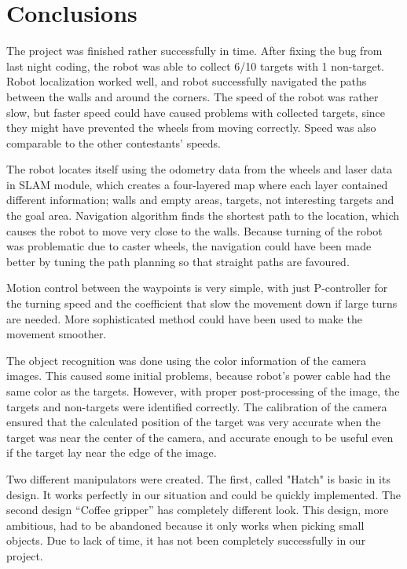 \documentclass[a4paper,10pt]{article}
\begin{document}
\section{Conclusions}

The project was finished rather successfully in time. After fixing the bug from last night coding, the robot was able to collect 6/10 targets with 1 non-target. Robot localization worked well, and robot successfully navigated the paths between the walls and around the corners. The speed of the robot was rather slow, but faster speed could have caused problems with collected targets, since they might have prevented the wheels from moving correctly. Speed was also comparable to the other contestants' speeds.

The robot locates itself using the odometry data from the wheels and laser data in SLAM module, which creates a four-layered map where each layer contained different information; walls and empty areas, targets, not interesting targets and the goal area. Navigation algorithm finds the shortest path to the location, which causes the robot to move very close to the walls. Because turning of the robot was problematic due to caster wheels, the navigation could have been made better by tuning the path planning so that straight paths are favoured.

Motion control between the waypoints is very simple, with just P-controller for the turning speed and the coefficient that slow the movement down if large turns are needed. More sophisticated method could have been used to make the movement smoother.

The object recognition was done using the color information of the camera images. This caused some initial problems, because robot’s power cable had the same color as the targets. However, with proper post-processing of the image, the targets and non-targets were identified correctly. The calibration of the camera ensured that the calculated position of the target was very accurate when the target was near the center of the camera, and accurate enough to be useful even if the target lay near the edge of the image.

Two different manipulators were created. The first, called "Hatch" is basic in its design. It works perfectly in our situation and could be quickly implemented. The second design “Coffee gripper” has completely different look. This design, more ambitious, had to be abandoned because it only works when picking small objects. Due to lack of time, it has not been completely successfully in our project.
\end{document}
